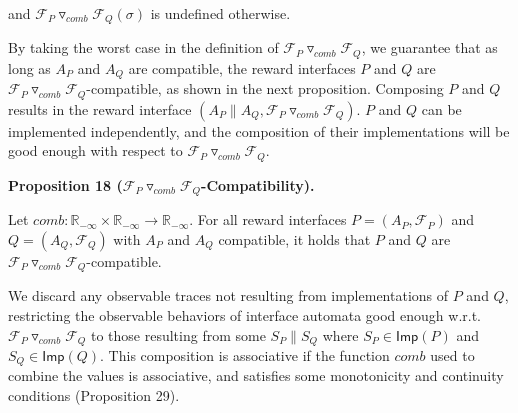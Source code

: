 \documentclass[10pt,a4paper]{article}
\begin{document}
and ${{\mathcal{F}_{P}}\mathbin{\triangledown_{\mathit{comb}}}{\mathcal{F}_{Q}}}(\sigma)$ is undefined otherwise.\par
 
 
 
 
By taking the worst case in the definition of ${{\mathcal{F}_{P}}\mathbin{\triangledown_{\mathit{comb}}}{\mathcal{F}_{Q}}}$, we guarantee that as long as $A_{P}$ and $A_{Q}$ are compatible, the reward interfaces $P$ and $Q$ are ${{\mathcal{F}_{P}}\mathbin{\triangledown_{\mathit{comb}}}{\mathcal{F}_{Q}}}$-compatible, as shown in the next proposition. Composing $P$ and $Q$ results in the reward interface $(A_{P}\parallel A_{Q},{{\mathcal{F}_{P}}\mathbin{\triangledown_{\mathit{comb}}}{\mathcal{F}_{Q}}})$. $P$ and $Q$ can be implemented independently, and the composition of their implementations will be good enough with respect to ${{\mathcal{F}_{P}}\mathbin{\triangledown_{\mathit{comb}}}{\mathcal{F}_{Q}}}$.\par
 
 
 
\par\medskip\noindent\textbf{Proposition 18 (${{\mathcal{F}_{P}}\mathbin{\triangledown_{\mathit{comb}}}{\mathcal{F}_{Q}}}$-Compatibility).}\par
 
 
Let $\mathit{comb}:\mathbb{R}_{-\infty}\times\mathbb{R}_{-\infty}\to\mathbb{R}_{-\infty}$. For all reward interfaces $P=(A_{P},\mathcal{F}_{P})$ and $Q=(A_{Q},\mathcal{F}_{Q})$ with $A_{P}$ and $A_{Q}$ compatible, it holds that $P$ and $Q$ are ${{\mathcal{F}_{P}}\mathbin{\triangledown_{\mathit{comb}}}{\mathcal{F}_{Q}}}$-compatible.\par
 
 
 
 
We discard any observable traces not resulting from implementations of $P$ and $Q$, restricting the observable behaviors of interface automata good enough w.r.t. ${{\mathcal{F}_{P}}\mathbin{\triangledown_{\mathit{comb}}}{\mathcal{F}_{Q}}}$ to those resulting from some $S_{P}\parallel S_{Q}$ where $S_{P}\in\mathsf{Imp}(P)$ and $S_{Q}\in\mathsf{Imp}(Q)$. This composition is associative if the function $\mathit{comb}$ used to combine the values is associative, and satisfies some monotonicity and continuity conditions (Proposition 29).\par
 
\end{document}
